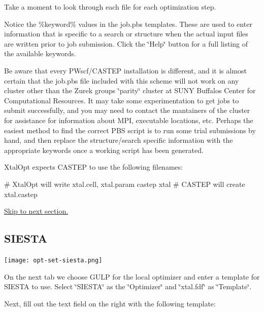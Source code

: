 Take a moment to look through each file for each optimization step.

Notice the \%keyword\% values in the job.\+pbs templates. These are used to enter information that is specific to a search or structure when the actual input files are written prior to job submission. Click the \char`\"{}\+Help\char`\"{} button for a full listing of the available keywords.

Be aware that every P\+Wscf/\+C\+A\+S\+T\+E\+P installation is different, and it is almost certain that the job.\+pbs file included with this scheme will not work on any cluster other than the Zurek group\textquotesingle{}s \char`\"{}parity\char`\"{} cluster at S\+U\+N\+Y Buffalo\textquotesingle{}s Center for Computational Resources. It may take some experimentation to get jobs to submit successfully, and you may need to contact the mantainers of the cluster for assistance for information about M\+P\+I, executable locations, etc. Perhaps the easiest method to find the correct P\+B\+S script is to run some trial submissions by hand, and then replace the structure/search specific information with the appropriate keywords once a working script has been generated.

Xtal\+Opt expects C\+A\+S\+T\+E\+P to use the following filenames\+:


\begin{DoxyCode}
\textcolor{preprocessor}{# XtalOpt will write xtal.cell, xtal.param}
castep xtal
\textcolor{preprocessor}{# CASTEP will create xtal.castep}
\end{DoxyCode}


\hyperlink{tut-xo_qisetup}{Skip to next section.}\hypertarget{tut-xo_siesta-opt}{}\subsection{S\+I\+E\+S\+T\+A}\label{tut-xo_siesta-opt}
 
\begin{DoxyImageNoCaption}
  \mbox{\texttt{[image: opt-set-siesta.png]}}
\end{DoxyImageNoCaption}


On the next tab we choose G\+U\+L\+P for the local optimizer and enter a template for S\+I\+E\+S\+T\+A to use. Select \char`\"{}\+S\+I\+E\+S\+T\+A\char`\"{} as the \char`\"{}\+Optimizer\char`\"{} and \char`\"{}xtal.\+fdf\char`\"{} as \char`\"{}\+Template\char`\"{}.

Next, fill out the text field on the right with the following template\+:


